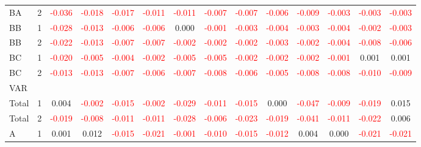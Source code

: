 \begin{table}[H]
{\begin{tabular}{llcccccccccccc}
BA & 2 & \textcolor{red}{-0.036} & \textcolor{red}{-0.018} & \textcolor{red}{-0.017} & \textcolor{red}{-0.011} & \textcolor{red}{-0.011} & \textcolor{red}{-0.007} & \textcolor{red}{-0.007} & \textcolor{red}{-0.006} & \textcolor{red}{-0.009} & \textcolor{red}{-0.003} & \textcolor{red}{-0.003} & \textcolor{red}{-0.003}\\
BB & 1 & \textcolor{red}{-0.028} & \textcolor{red}{-0.013} & \textcolor{red}{-0.006} & \textcolor{red}{-0.006} & 0.000 & \textcolor{red}{-0.001} & \textcolor{red}{-0.003} & \textcolor{red}{-0.004} & \textcolor{red}{-0.003} & \textcolor{red}{-0.004} & \textcolor{red}{-0.002} & \textcolor{red}{-0.003}\\
BB & 2 & \textcolor{red}{-0.022} & \textcolor{red}{-0.013} & \textcolor{red}{-0.007} & \textcolor{red}{-0.007} & \textcolor{red}{-0.002} & \textcolor{red}{-0.002} & \textcolor{red}{-0.002} & \textcolor{red}{-0.003} & \textcolor{red}{-0.002} & \textcolor{red}{-0.004} & \textcolor{red}{-0.008} & \textcolor{red}{-0.006}\\
BC & 1 & \textcolor{red}{-0.020} & \textcolor{red}{-0.005} & \textcolor{red}{-0.004} & \textcolor{red}{-0.002} & \textcolor{red}{-0.005} & \textcolor{red}{-0.005} & \textcolor{red}{-0.002} & \textcolor{red}{-0.002} & \textcolor{red}{-0.002} & \textcolor{red}{-0.001} & 0.001 & 0.001\\
BC & 2 & \textcolor{red}{-0.013} & \textcolor{red}{-0.013} & \textcolor{red}{-0.007} & \textcolor{red}{-0.006} & \textcolor{red}{-0.007} & \textcolor{red}{-0.008} & \textcolor{red}{-0.006} & \textcolor{red}{-0.005} & \textcolor{red}{-0.008} & \textcolor{red}{-0.008} & \textcolor{red}{-0.010} & \textcolor{red}{-0.009}\\
\hline
VAR &  &  &  &  &  &  &  &  &  &  &  &  & \\
\hline
Total & 1 & 0.004 & \textcolor{red}{-0.002} & \textcolor{red}{-0.015} & \textcolor{red}{-0.002} & \textcolor{red}{-0.029} & \textcolor{red}{-0.011} & \textcolor{red}{-0.015} & 0.000 & \textcolor{red}{-0.047} & \textcolor{red}{-0.009} & \textcolor{red}{-0.019} & 0.015\\
Total & 2 & \textcolor{red}{-0.019} & \textcolor{red}{-0.008} & \textcolor{red}{-0.011} & \textcolor{red}{-0.011} & \textcolor{red}{-0.028} & \textcolor{red}{-0.006} & \textcolor{red}{-0.023} & \textcolor{red}{-0.019} & \textcolor{red}{-0.041} & \textcolor{red}{-0.011} & \textcolor{red}{-0.022} & 0.006\\
A & 1 & 0.001 & 0.012 & \textcolor{red}{-0.015} & \textcolor{red}{-0.021} & \textcolor{red}{-0.001} & \textcolor{red}{-0.010} & \textcolor{red}{-0.015} & \textcolor{red}{-0.012} & 0.004 & 0.000 & \textcolor{red}{-0.021} & \textcolor{red}{-0.021}\\

\end{tabular}}
\end{table}
